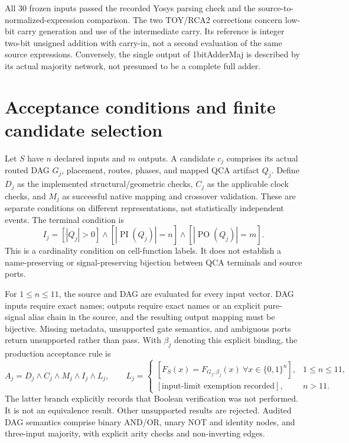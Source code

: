 \documentclass[11pt,a4paper]{article}
\begin{document}
All 30 frozen inputs passed the recorded Yosys parsing check and the source-to-normalized-expression comparison. The two TOY/RCA2 corrections concern low-bit carry generation and use of the intermediate carry. Its reference is integer two-bit unsigned addition with carry-in, not a second evaluation of the same source expressions. Conversely, the single output of 1bitAdderMaj is described by its actual majority network, not presumed to be a complete full adder.

\section{Acceptance conditions and finite candidate selection}
Let $S$ have $n$ declared inputs and $m$ outputs. A candidate $c_j$ comprises its actual routed DAG $G_j$, placement, routes, phases, and mapped QCA artifact $Q_j$. Define $D_j$ as the implemented structural/geometric checks, $C_j$ as the applicable clock checks, and $M_j$ as successful native mapping and crossover validation. These are separate conditions on different representations, not statistically independent events. The terminal condition is
\begin{equation}
 I_j=[|Q_j|>0]\land[|\operatorname{PI}(Q_j)|=n]
                  \land[|\operatorname{PO}(Q_j)|=m].
\end{equation}
This is a cardinality condition on cell-function labels. It does not establish a name-preserving or signal-preserving bijection between QCA terminals and source ports.

For $1\le n\le11$, the source and DAG are evaluated for every input vector. DAG inputs require exact names; outputs require exact names or an explicit pure-signal alias chain in the source, and the resulting output mapping must be bijective. Missing metadata, unsupported gate semantics, and ambiguous ports return unsupported rather than pass. With $\beta_j$ denoting this explicit binding, the production acceptance rule is
\begin{equation}
 A_j=D_j\land C_j\land M_j\land I_j\land L_j,\qquad
 L_j=\begin{cases}
 [F_S(x)=F_{G_j,\beta_j}(x)\ \forall x\in\{0,1\}^n],&1\le n\le11,\\
 [\text{input-limit exemption recorded}],&n>11.
 \end{cases}
\end{equation}
The latter branch explicitly records that Boolean verification was not performed. It is not an equivalence result. Other unsupported results are rejected. Audited DAG semantics comprise binary AND/OR, unary NOT and identity nodes, and three-input majority, with explicit arity checks and non-inverting edges.
\end{document}
